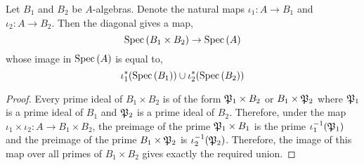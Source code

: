 \documentclass[12pt]{extarticle}
\begin{document}
\begin{lemma} \label{spec_of_products}
Let $B_1$ and $B_2$ be $A$-algebras. Denote the natural maps $\iota_1 : A \to B_1$ and $\iota_2 : A \to B_2$. Then the diagonal gives a map,
\[ \Spec{B_1 \times B_2} \to \Spec{A} \]
whose image in $\Spec{A}$ is equal to,
\[ \iota_1^*(\Spec{B_1}) \cup \iota_2^*(\Spec{B_2}) \]
\end{lemma}

\begin{proof}
Every prime ideal of $B_1 \times B_2$ is of the form $\P_1 \times B_2$ or $B_1 \times \P_2$ where $\P_1$ is a prime ideal of $B_1$ and $\P_2$ is a prime ideal of $B_2$. Therefore, under the map $\iota_1 \times \iota_2 : A \to B_1 \times B_2$, the preimage of the prime $\P_1 \times B_1$ is the prime $\iota_1^{-1}(\P_1)$ and the preimage of the prime $B_1 \times \P_2$ is $\iota_2^{-1}(\P_2)$. Therefore, the image of this map over all primes of $B_1 \times B_2$ gives exactly the required union. 
\end{proof}
\end{document}
